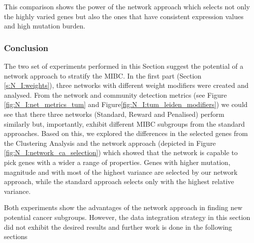 This comparison shows the power of the network approach which selects not only the highly varied genes but also the ones that have consistent expression values and high mutation burden.

\subsubsection{Conclusion}

The two set of experiments performed in this Section suggest the potential of a network approach to stratify the MIBC. In the first part (Section \ref{s:N_I:weights}), three networks with different weight modifiers were created and analysed. From the network and community detection metrics (see Figure \ref{fig:N_I:net_metrics_tum} and Figure\ref{fig:N_I:tum_leiden_modifiers}) we could see that there three networks (Standard, Reward and Penalised) perform similarly but, importantly, exhibit different MIBC subgroups from the standard approaches. Based on this, we explored the differences in the selected genes from the Clustering Analysis and the network approach (depicted in Figure \ref{fig:N_I:network_ca_selection}) which showed that the network is capable to pick genes with a wider a range of properties. Genes with higher mutation, magnitude and with most of the highest variance are selected by our network approach, while the standard approach selects only with the highest relative variance.

Both experiments show the advantages of the network approach in finding new potential cancer subgroups. However, the data integration strategy in this section did not exhibit the desired results and further work is done in the following sections

\newpage

